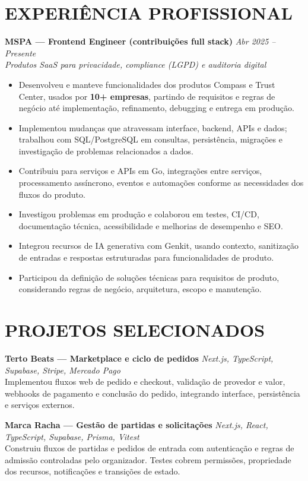 \documentclass[10pt,a4paper]{article}
\begin{document}
\section*{EXPERIÊNCIA PROFISSIONAL}
\textbf{MSPA — Frontend Engineer (contribuições full stack)} \hfill \textit{Abr 2025 -- Presente}\\
\textit{Produtos SaaS para privacidade, compliance (LGPD) e auditoria digital}
\begin{itemize}
\item Desenvolveu e manteve funcionalidades dos produtos Compass e Trust Center, usados por \textbf{10+ empresas}, partindo de requisitos e regras de negócio até implementação, refinamento, debugging e entrega em produção.
\item Implementou mudanças que atravessam interface, backend, APIs e dados; trabalhou com SQL/PostgreSQL em consultas, persistência, migrações e investigação de problemas relacionados a dados.
\item Contribuiu para serviços e APIs em Go, integrações entre serviços, processamento assíncrono, eventos e automações conforme as necessidades dos fluxos do produto.
\item Investigou problemas em produção e colaborou em testes, CI/CD, documentação técnica, acessibilidade e melhorias de desempenho e SEO.
\item Integrou recursos de IA generativa com Genkit, usando contexto, sanitização de entradas e respostas estruturadas para funcionalidades de produto.
\item Participou da definição de soluções técnicas para requisitos de produto, considerando regras de negócio, arquitetura, escopo e manutenção.
\end{itemize}
\section*{PROJETOS SELECIONADOS}
\textbf{Terto Beats — Marketplace e ciclo de pedidos} \hfill \textit{Next.js, TypeScript, Supabase, Stripe, Mercado Pago}\\
Implementou fluxos web de pedido e checkout, validação de provedor e valor, webhooks de pagamento e conclusão do pedido, integrando interface, persistência e serviços externos.

\vspace{2pt}
\textbf{Marca Racha — Gestão de partidas e solicitações} \hfill \textit{Next.js, React, TypeScript, Supabase, Prisma, Vitest}\\
Construiu fluxos de partidas e pedidos de entrada com autenticação e regras de admissão controladas pelo organizador. Testes cobrem permissões, propriedade dos recursos, notificações e transições de estado.
\end{document}
